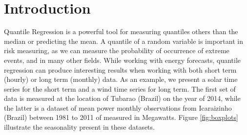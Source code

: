 \section{Introduction}


Quantile Regression is a powerful tool for measuring quantiles others than the median or predicting the mean. A quantile of a random variable is important in risk measuring, as we can measure the probability of occurrence of extreme events, and in many other fields. While working with energy forecasts, quantile regression can produce interesting results when working with both short term (hourly) or long term (monthly) data. As an example, we present a solar time series for the short term and a wind time series for long term. The first set of data is measured at the location of Tubarao (Brazil) on the year of 2014, while the latter is a dataset of mean power  monthly observations from Icaraizinho (Brazil) between 1981 to 2011 of measured in Megawatts. Figure \ref{fig:boxplots} illustrate the seasonality present in these datasets.

